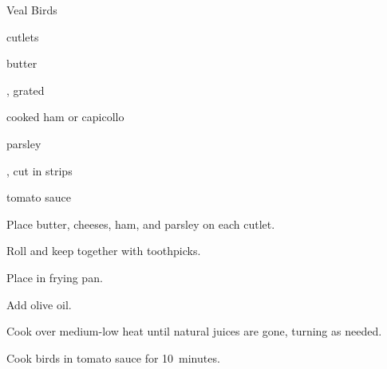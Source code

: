 \begin{recipe}{Veal Birds}{}{}

\begin{ingredients}
\item {} cutlets
\item butter
\item {}, grated
\item cooked ham or capicollo
\item parsley
\item {}, cut in strips
\item tomato sauce
\end{ingredients}

\begin{directions}
\item Place butter, cheeses, ham, and parsley on each cutlet.
\item Roll and keep together with toothpicks.
\item Place in frying pan.
\item Add olive oil.
\item Cook over medium-low heat until natural juices are gone, turning as needed.
\item Cook birds in tomato sauce for 10~minutes.
\end{directions}

\end{recipe}
